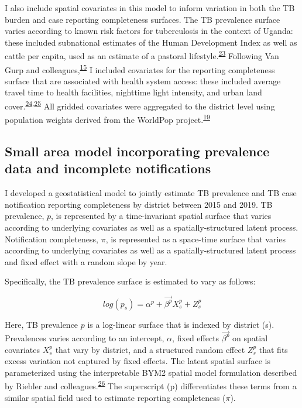 \documentclass[
]{article}
\begin{document}
I also include spatial covariates in this model to inform variation in both the TB burden and case reporting completeness surfaces. The TB prevalence surface varies according to known risk factors for tuberculosis in the context of Uganda: these included subnational estimates of the Human Development Index as well as cattle per capita, used as an estimate of a pastoral lifestyle.\textsuperscript{\protect\hyperlink{ref-UgandaNationalTuberculosisandLeprosyProgramme2020a}{23}} Following Van Gurp and colleagues,\textsuperscript{\protect\hyperlink{ref-VanGurp2020}{15}} I included covariates for the reporting completeness surface that are associated with health system access: these included average travel time to health facilities, nighttime light intensity, and urban land cover.\textsuperscript{\protect\hyperlink{ref-Weiss2020}{24},\protect\hyperlink{ref-Thomson2019}{25}} All gridded covariates were aggregated to the district level using population weights derived from the WorldPop project.\textsuperscript{\protect\hyperlink{ref-Tatem2017}{19}}

\hypertarget{small-area-model-incorporating-prevalence-data-and-incomplete-notifications}{%
\subsection{Small area model incorporating prevalence data and incomplete notifications}\label{small-area-model-incorporating-prevalence-data-and-incomplete-notifications}}

I developed a geostatistical model to jointly estimate TB prevalence and TB case notification reporting completeness by district between 2015 and 2019. TB prevalence, \(p\), is represented by a time-invariant spatial surface that varies according to underlying covariates as well as a spatially-structured latent process. Notification completeness, \(\pi\), is represented as a space-time surface that varies according to underlying covariates as well as a spatially-structured latent process and fixed effect with a random slope by year.

Specifically, the TB prevalence surface is estimated to vary as follows:

\[log(p_s) = \alpha^p + \overrightarrow{\beta^p}X^p_s + Z^p_s\]

Here, TB prevalence \(p\) is a log-linear surface that is indexed by district (s). Prevalences varies according to an intercept, \(\alpha\), fixed effects \(\overrightarrow{\beta^p}\) on spatial covariates \(X^p_s\) that vary by district, and a structured random effect \(Z^p_s\) that fits excess variation not captured by fixed effects. The latent spatial surface is parameterized using the interpretable BYM2 spatial model formulation described by Riebler and colleagues.\textsuperscript{\protect\hyperlink{ref-Riebler2016}{26}} The superscript (p) differentiates these terms from a similar spatial field used to estimate reporting completeness (\(\pi\)).
\end{document}
